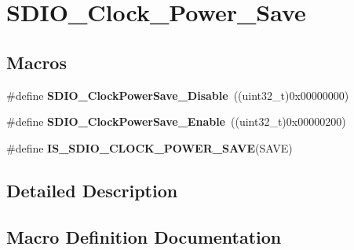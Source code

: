 \hypertarget{group___s_d_i_o___clock___power___save}{}\section{S\+D\+I\+O\+\_\+\+Clock\+\_\+\+Power\+\_\+\+Save}
\label{group___s_d_i_o___clock___power___save}
\subsection*{Macros}
\begin{DoxyCompactItemize}
\item 
\hypertarget{group___s_d_i_o___clock___power___save_ga032aa5fb2dfd7ba5dbd60a3845c82ba0}{}\#define {\bfseries S\+D\+I\+O\+\_\+\+Clock\+Power\+Save\+\_\+\+Disable}~((uint32\+\_\+t)0x00000000)\label{group___s_d_i_o___clock___power___save_ga032aa5fb2dfd7ba5dbd60a3845c82ba0}

\item 
\hypertarget{group___s_d_i_o___clock___power___save_ga9f5b66a0044c4ff36a3eb1ec758f7ea7}{}\#define {\bfseries S\+D\+I\+O\+\_\+\+Clock\+Power\+Save\+\_\+\+Enable}~((uint32\+\_\+t)0x00000200)\label{group___s_d_i_o___clock___power___save_ga9f5b66a0044c4ff36a3eb1ec758f7ea7}

\item 
\#define {\bfseries I\+S\+\_\+\+S\+D\+I\+O\+\_\+\+C\+L\+O\+C\+K\+\_\+\+P\+O\+W\+E\+R\+\_\+\+S\+A\+V\+E}(S\+A\+V\+E)
\end{DoxyCompactItemize}


\subsection{Detailed Description}


\subsection{Macro Definition Documentation}
\hypertarget{group___s_d_i_o___clock___power___save_ga41988203e5d4e35a755aa604f1876cd3}{}
